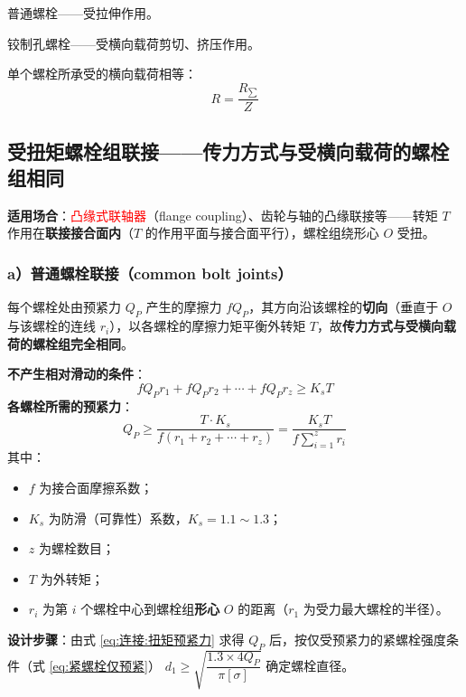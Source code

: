 普通螺栓——受拉伸作用。

铰制孔螺栓——受横向载荷剪切、挤压作用。

单个螺栓所承受的横向载荷相等：
\begin{equation}
  R=\frac{R_{\sum}}{Z}
\end{equation}

\subsection{受扭矩螺栓组联接——传力方式与受横向载荷的螺栓组相同}

\textbf{适用场合}：\textcolor{red}{凸缘式联轴器}（flange coupling）、齿轮与轴的凸缘联接等——转矩 $T$ 作用在\textbf{联接接合面内}（$T$ 的作用平面与接合面平行），螺栓组绕形心 $O$ 受扭。

\subsubsection*{a）普通螺栓联接（common bolt joints）}

每个螺栓处由预紧力 $Q_P$ 产生的摩擦力 $fQ_P$，其方向沿该螺栓的\textbf{切向}（垂直于 $O$ 与该螺栓的连线 $r_i$），以各螺栓的摩擦力矩平衡外转矩 $T$，故\textbf{传力方式与受横向载荷的螺栓组完全相同}。

\begin{theorem}[受扭矩普通螺栓组的防滑条件与预紧力]
\label{thm:扭矩普通螺栓}
\textbf{不产生相对滑动的条件}：
\begin{equation}
	fQ_Pr_1+fQ_Pr_2+\cdots+fQ_Pr_z\ge K_sT
	\label{eq:连接:扭矩防滑}
\end{equation}
\textbf{各螺栓所需的预紧力}：
\begin{equation}
	Q_P\ge\frac{T\cdot K_s}{f(r_1+r_2+\cdots+r_z)}=\frac{K_sT}{f\displaystyle\sum_{i=1}^{z}r_i}
	\label{eq:连接:扭矩预紧力}
\end{equation}
其中：
\begin{itemize}
	\item $f$ 为接合面摩擦系数；
	\item $K_s$ 为防滑（可靠性）系数，$K_s=1.1\sim1.3$；
	\item $z$ 为螺栓数目；
	\item $T$ 为外转矩；
	\item $r_i$ 为第 $i$ 个螺栓中心到螺栓组\textbf{形心} $O$ 的距离（$r_1$ 为受力最大螺栓的半径）。
\end{itemize}
\textbf{设计步骤}：由式 \eqref{eq:连接:扭矩预紧力} 求得 $Q_P$ 后，按仅受预紧力的紧螺栓强度条件（式 \eqref{eq:紧螺栓仅预紧}）
$d_1\ge\sqrt{\dfrac{1.3\times4Q_P}{\pi[\sigma]}}$ 确定螺栓直径。
\end{theorem}

